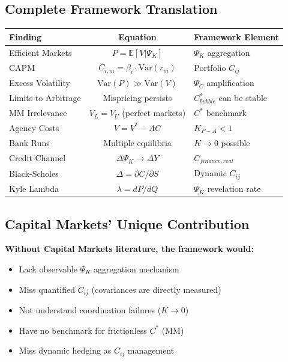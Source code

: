 \subsection{Complete Framework Translation}

\begin{center}
\renewcommand{\arraystretch}{1.5}
\begin{tabular}{|l|c|l|}
\hline
\textbf{Finding} & \textbf{Equation} & \textbf{Framework Element} \\
\hline
Efficient Markets & $P = \mathbb{E}[V | \Psi_K]$ & $\Psi_K$ aggregation \\
\hline
CAPM & $C_{i,m} = \beta_i \cdot \text{Var}(r_m)$ & Portfolio $C_{ij}$ \\
\hline
Excess Volatility & $\text{Var}(P) \gg \text{Var}(V)$ & $\Psi_C$ amplification \\
\hline
Limits to Arbitrage & Mispricing persists & $C^*_{bubble}$ can be stable \\
\hline
MM Irrelevance & $V_L = V_U$ (perfect markets) & $C^*$ benchmark \\
\hline
Agency Costs & $V = V^* - AC$ & $K_{P-A} < 1$ \\
\hline
Bank Runs & Multiple equilibria & $K \to 0$ possible \\
\hline
Credit Channel & $\Delta \Psi_K \to \Delta Y$ & $C_{finance, real}$ \\
\hline
Black-Scholes & $\Delta = \partial C / \partial S$ & Dynamic $C_{ij}$ \\
\hline
Kyle Lambda & $\lambda = dP/dQ$ & $\Psi_K$ revelation rate \\
\hline
\end{tabular}
\end{center}

\subsection{Capital Markets' Unique Contribution}

\textbf{Without Capital Markets literature, the framework would:}
\begin{itemize}
    \item Lack observable $\Psi_K$ aggregation mechanism
    \item Miss quantified $C_{ij}$ (covariances are directly measured)
    \item Not understand coordination failures ($K \to 0$)
    \item Have no benchmark for frictionless $C^*$ (MM)
    \item Miss dynamic hedging as $C_{ij}$ management
\end{itemize}

